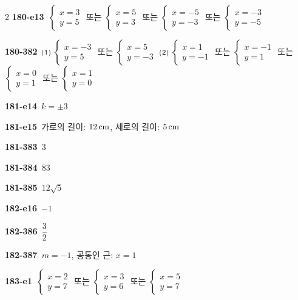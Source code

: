 \documentclass[10pt,a4paper]{article}
\begin{document}
\begin{multicols}{2}
\noindent\textbf{180-e13}\ $\begin{cases} x=3 \\ y=5 \end{cases}$ 또는 $\begin{cases} x=5 \\ y=3 \end{cases}$ 또는 $\begin{cases} x=-5 \\ y=-3 \end{cases}$ 또는 $\begin{cases} x=-3 \\ y=-5 \end{cases}$\par
\noindent\textbf{180-382}\ ⑴ $\begin{cases} x=-3 \\ y=5 \end{cases}$ 또는 $\begin{cases} x=5 \\ y=-3 \end{cases}$ \quad ⑵ $\begin{cases} x=1 \\ y=-1 \end{cases}$ 또는 $\begin{cases} x=-1 \\ y=1 \end{cases}$ 또는 $\begin{cases} x=0 \\ y=1 \end{cases}$ 또는 $\begin{cases} x=1 \\ y=0 \end{cases}$\par
\noindent\textbf{181-e14}\ $k=\pm 3$\par
\noindent\textbf{181-e15}\ 가로의 길이: $12\mkern3mu \mathrm{cm}$, 세로의 길이: $5\mkern3mu \mathrm{cm}$\par
\noindent\textbf{181-383}\ $3$\par
\noindent\textbf{181-384}\ $83$\par
\noindent\textbf{181-385}\ $12\sqrt{5}$\par
\noindent\textbf{182-e16}\ $-1$\par
\noindent\textbf{182-386}\ $\dfrac{3}{2}$\par
\noindent\textbf{182-387}\ $m=-1$, 공통인 근: $x=1$\par
\noindent\textbf{183-e1}\ $\begin{cases} x=2 \\ y=7 \end{cases}$ 또는 $\begin{cases} x=3 \\ y=6 \end{cases}$ 또는 $\begin{cases} x=5 \\ y=7 \end{cases}$\par

\end{multicols}
\end{document}
